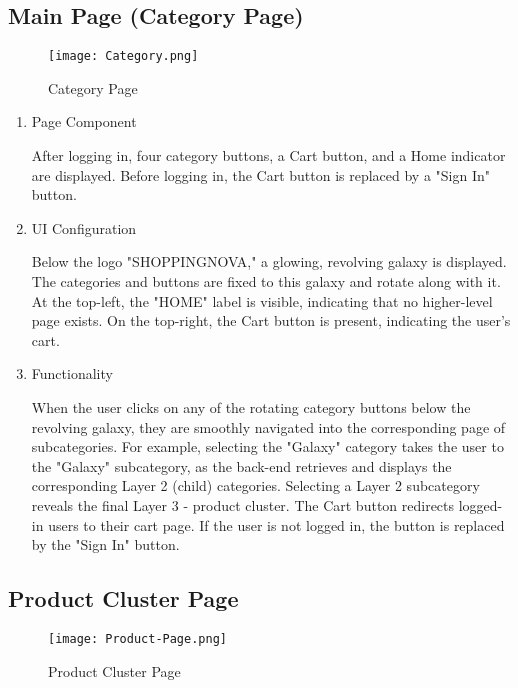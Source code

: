 \documentclass[conference]{IEEEtran}
\begin{document}
\subsection{Main Page (Category Page)}
\begin{figure}[H]
    \centering    \texttt{[image: Category.png]}
    \caption{Category Page}
    \label{fig:Category Page}
\end{figure}

\begin{enumerate}
\setlength{\parindent}{2ex}
\setlength{\parskip}{0.5em}
\item Page Component

After logging in, four category buttons, a Cart button, and a Home indicator are displayed. Before logging in, the Cart button is replaced by a "Sign In" button.

\item UI Configuration

Below the logo "SHOPPINGNOVA," a glowing, revolving galaxy is displayed. The categories and buttons are fixed to this galaxy and rotate along with it. At the top-left, the "HOME" label is visible, indicating that no higher-level page exists. On the top-right, the Cart button is present, indicating the user’s cart.

\item Functionality

When the user clicks on any of the rotating category buttons below the revolving galaxy, they are smoothly navigated into the corresponding page of subcategories. For example, selecting the "Galaxy" category takes the user to the "Galaxy" subcategory, as the back-end retrieves and displays the corresponding Layer 2 (child) categories. Selecting a Layer 2 subcategory reveals the final Layer 3 - product cluster. The Cart button redirects logged-in users to their cart page. If the user is not logged in, the button is replaced by the "Sign In" button.

\end{enumerate}

\subsection{Product Cluster Page}
\begin{figure}[H]
    \centering
    \texttt{[image: Product-Page.png]}
    \caption{Product Cluster Page}
    \label{fig:Product Cluster Page}
\end{figure}
\end{document}

